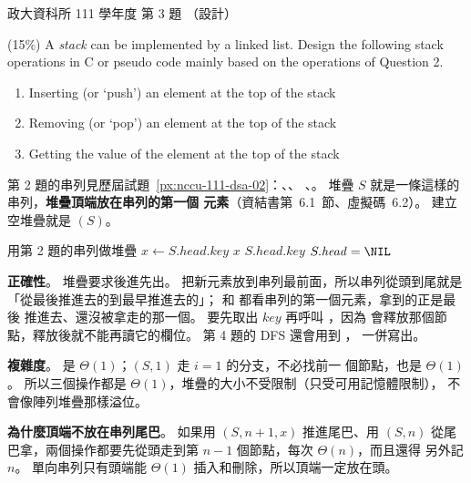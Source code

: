 \begin{pastexam}[label={px:nccu-111-dsa-03}]{政大資科所 111 學年度 第 3 題}
（設計）

(15\%) A \textit{stack} can be implemented by a linked list. Design the following stack operations in C or pseudo code mainly based on the operations of Question 2.
\begin{enumerate}[label=3.\arabic*]
\item Inserting (or `push') an element at the top of the stack
\item Removing (or `pop') an element at the top of the stack
\item Getting the value of the element at the top of the stack
\end{enumerate}
\end{pastexam}

\begin{pastsoln}
第 2 題的串列見歷屆試題~\ref{px:nccu-111-dsa-02}：、、
、。 堆疊 $S$ 就是一條這樣的串列，\textbf{堆疊頂端放在串列的第一個
元素}（資結書第~6.1~節、虛擬碼~6.2）。 建立空堆疊就是 $(S)$。

\begin{pseudo}{用第 2 題的串列做堆疊}
 
    \State {}
\EndProcedure
\Statex
{} 
        \State {}
    \EndIf
    \State $x \gets S.\mathit{head}.\mathit{key}$ 
    \State {}
    \State \Return $x$
\EndFunction
\Statex
{} 
        \State {}
    \EndIf
    \State \Return $S.\mathit{head}.\mathit{key}$
\EndFunction
\Statex
{}
    \State \Return $S.\mathit{head} = \NIL$
\EndFunction
\end{pseudo}

\textbf{正確性}。 堆疊要求後進先出。  把新元素放到串列最前面，所以串列從頭到尾就是
「從最後推進去的到最早推進去的」； 和  都看串列的第一個元素，拿到的正是最後
推進去、還沒被拿走的那一個。  要先取出 $\mathit{key}$ 再呼叫 ，因為
 會釋放那個節點，釋放後就不能再讀它的欄位。 第 4 題的 DFS 還會用到 ，
一併寫出。

\textbf{複雜度}。  是 $\Theta(1)$；$(S, 1)$ 走 $i = 1$ 的分支，不必找前一
個節點，也是 $\Theta(1)$。 所以三個操作都是 $\Theta(1)$，堆疊的大小不受限制（只受可用記憶體限制），
不會像陣列堆疊那樣溢位。

\textbf{為什麼頂端不放在串列尾巴}。 如果用 $(S, n + 1, x)$ 推進尾巴、用
$(S, n)$ 從尾巴拿，兩個操作都要先從頭走到第 $n - 1$ 個節點，每次 $\Theta(n)$，而且還得
另外記 $n$。 單向串列只有頭端能 $\Theta(1)$ 插入和刪除，所以頂端一定放在頭。
\end{pastsoln}
